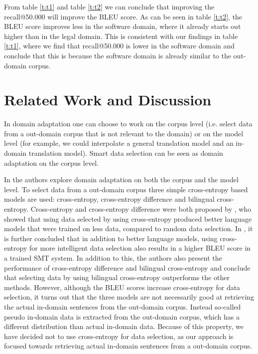 \documentclass[11pt]{article}
\begin{document}
From table \ref{t:t1} and table \ref{t:t2} we can conclude that improving the recall@50.000 will improve the BLEU score. As can be seen in table \ref{t:t2}, the BLEU score improves less in the software domain, where it already starts out higher than in the legal domain. This is consistent with our findings in table \ref{t:t1}, where we find that recall@50.000 is lower in the software domain and conclude that this is because the software domain is already similar to the out-domain corpus.

\section{Related Work and Discussion}
\label{sec:related}
In domain adaptation one can choose to work on the corpus level (i.e. select data from a out-domain corpus that is not relevant to the domain) or on the model level (for example, we could interpolate a general translation model and an in-domain translation model). Smart data selection can be seen as domain adaptation on the corpus level. 

In \cite{pseudo} the authors explore domain adaptation on both the corpus and the model level. To select data from a out-domain corpus three simple cross-entropy based models are used: cross-entropy, cross-entropy difference and bilingual cross-entropy. Cross-entropy and cross-entropy difference were both proposed by \cite{intelligent}, who showed that using data selected by using cross-entropy produced better language models that were trained on less data, compared to random data selection. In \cite{pseudo}, it is further concluded that in addition to better language models, using cross-entropy for more intelligent data selection also results in a higher BLEU score in a trained SMT system. In addition to this, the authors also present the performance of cross-entropy difference and bilingual cross-entropy and conclude that selecting data by using bilingual cross-entropy outperforms the other methods. However, although the BLEU scores increase cross-entropy for data selection, it turns out that the three models are not necessarily good at retrieving the actual in-domain sentences from the out-domain corpus. Instead so-called pseudo in-domain data is extracted from the out-domain corpus, which has a different distribution than actual in-domain data. Because of this property, we have decided not to use cross-entropy for data selection, as our approach is focused towards retrieving actual in-domain sentences from a out-domain corpus.
\end{document}
